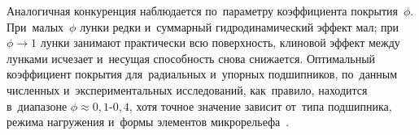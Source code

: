 Аналогичная конкуренция наблюдается по~параметру коэффициента покрытия~$\phi$. При~малых~$\phi$ лунки редки и~суммарный гидродинамический эффект мал; при~$\phi \to 1$ лунки занимают практически всю поверхность, клиновой эффект между лунками исчезает и~несущая способность снова снижается. Оптимальный коэффициент покрытия для~радиальных и~упорных подшипников, по~данным численных и~экспериментальных исследований, как~правило, находится в~диапазоне $\phi \approx 0{,}1$-$0{,}4$, хотя точное значение зависит от~типа подшипника, режима нагружения и~формы элементов микрорельефа~\cite{senatore2018}.
